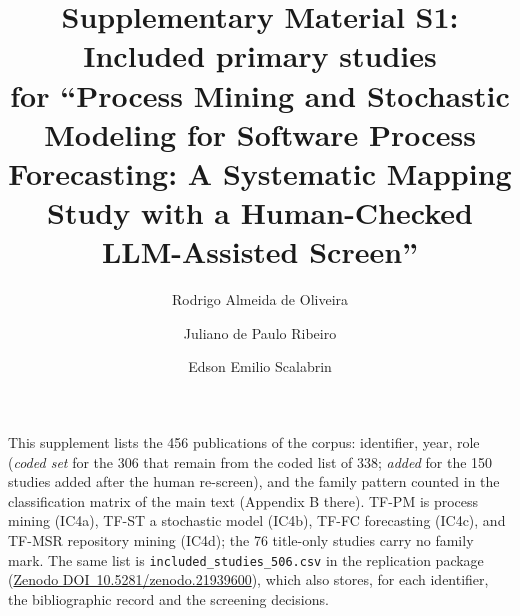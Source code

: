 \documentclass[review,3p,times]{elsarticle}
\newcommand{\zenododoi}{10.5281/zenodo.21939600}
\newcommand{\zenododoiurl}{https://doi.org/\zenododoi}
\begin{document}
\begin{frontmatter}
\title{Supplementary Material S1: Included primary studies\\
\large for ``Process Mining and Stochastic Modeling for Software Process
Forecasting: A Systematic Mapping Study with a Human-Checked LLM-Assisted
Screen''}
\author[pucpr]{Rodrigo Almeida de Oliveira}
\author[pucpr]{Juliano de Paulo Ribeiro}
\author[pucpr]{Edson Emilio Scalabrin}
\end{frontmatter}

This supplement lists the 456 publications of the corpus: identifier,
year, role (\emph{coded set} for the 306 that remain from the coded list
of 338; \emph{added} for the 150 studies added after the human re-screen),
and the family pattern counted in the classification matrix of the main
text (Appendix B there). TF-PM is process mining (IC4a), TF-ST a stochastic
model (IC4b), TF-FC forecasting (IC4c), and TF-MSR repository mining
(IC4d); the 76 title-only studies carry no family mark. The same list is
\texttt{included\_studies\_506.csv} in the replication package
(\href{\zenododoiurl}{Zenodo DOI~\zenododoi}), which also stores, for each
identifier, the bibliographic record and the screening decisions.


\end{document}
